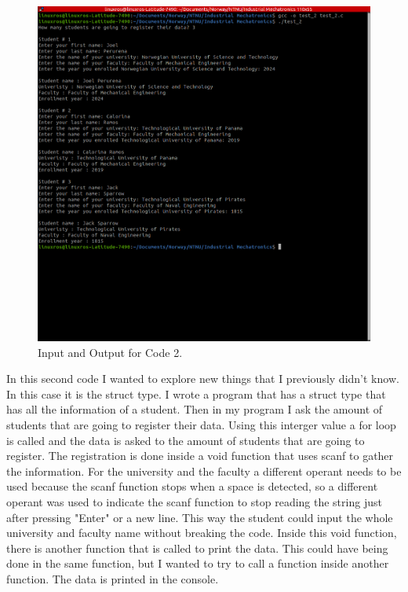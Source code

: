 \documentclass[12pt, letterpaper]{article}
\begin{document}
\begin{figure}[ht]
    \centering
    \includegraphics[width=0.8\linewidth]{test_2.png} 
    \caption{Input and Output for Code 2.}
  \end{figure}
  In this second code I wanted to explore new things that I previously didn't know. In this case it is the struct type. I wrote a program that has a struct
  type that has all the information of a student. Then in my program I ask the amount of students that are going to register their data. Using this interger value
  a for loop is called and the data is asked to the amount of students that are going to register. The registration is done inside a void function that uses
  scanf to gather the information. For the university and the faculty a different operant needs to be used because the scanf function stops when a space is
  detected, so a different operant was used to indicate the scanf function to stop reading the string just after pressing "Enter" or a new line. This way
  the student could input the whole university and faculty name without breaking the code. Inside this void function, there is another function that is called
  to print the data. This could have being done in the same function, but I wanted to try to call a function inside another function. The data is printed in
  the console.
\end{document}

